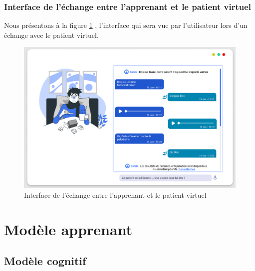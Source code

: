 \subsubsection{Interface de l'échange entre l'apprenant et le patient virtuel}
Nous présentons à la figure \ref{fig:echange} , l'interface qui sera vue par l'utilisateur lors d'un échange avec le patient virtuel.
\begin{figure}[H]
    \centering
    \includegraphics[width=\textwidth]{figures/patient-apprenant.png}
        \captionsetup{justification=centering}
    \caption{Interface de l'échange entre l'apprenant et le patient virtuel}
    \label{fig:echange}
\end{figure}

\section{Modèle apprenant}

\subsection{Modèle cognitif}


